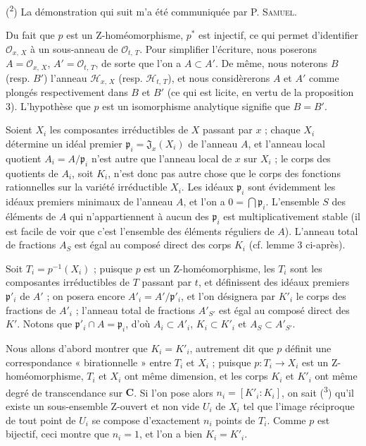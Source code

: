 (\textsuperscript{2}) La démonstration qui suit m'a été communiquée par P. \textsc{Samuel}.



Du fait que $p$ est un Z-homéomorphisme, $p^*$ est injectif, ce qui permet d'identifier $\mathcal{O}_{x,\, X}$ à un sous-anneau de $\mathcal{O}_{t,\, T}$. Pour simplifier l'écriture, nous poserons $A = \mathcal{O}_{x,\, X}$, $A' = \mathcal{O}_{t,\, T}$, de sorte que l'on a $A \subset A'$. De même, nous noterons $B$ (resp. $B'$) l'anneau $\mathcal{H}_{x,\, X}$ (resp. $\mathcal{H}_{t,\, T}$), et nous considèrerons $A$ et $A'$ comme plongés respectivement dans $B$ et $B'$ (ce qui est licite, en vertu de la proposition 3). L'hypothèse que $p$ est un isomorphisme analytique signifie que $B = B'$.

Soient $X_i$ les composantes irréductibles de $X$ passant par $x$ ; chaque $X_i$ détermine un idéal premier $\mathfrak{p}_i = \mathfrak{J}_x(X_i)$ de l'anneau $A$, et l'anneau local quotient $A_i = A/\mathfrak{p}_i$ n'est autre que l'anneau local de $x$ sur $X_i$ ; le corps des quotients de $A_i$, soit $K_i$, n'est donc pas autre chose que le corps des fonctions rationnelles sur la variété irréductible $X_i$. Les idéaux $\mathfrak{p}_i$ sont évidemment les idéaux premiers minimaux de l'anneau $A$, et l'on a $0 = \bigcap \mathfrak{p}_i$. L'ensemble $S$ des éléments de $A$ qui n'appartiennent à aucun des $\mathfrak{p}_i$ est multiplicativement stable (il est facile de voir que c'est l'ensemble des éléments réguliers de $A$). L'anneau total de fractions $A_S$ est égal au composé direct des corps $K_i$ (cf. lemme 3 ci-après).

Soit $T_i = p^{-1}(X_i)$ ; puisque $p$ est un Z-homéomorphisme, les $T_i$ sont les composantes irréductibles de $T$ passant par $t$, et définissent des idéaux premiers $\mathfrak{p}'_i$ de $A'$ ; on posera encore $A'_i = A'/\mathfrak{p}'_i$, et l'on désignera par $K'_i$ le corps des fractions de $A'_i$ ; l'anneau total de fractions $A'_{S'}$ est égal au composé direct des $K'$. Notons que $\mathfrak{p}'_i \cap A = \mathfrak{p}_i$, d'où $A_i \subset A'_i$, $K_i \subset K'_i$ et $A_S \subset A'_{S'}$.

Nous allons d'abord montrer que $K_i = K'_i$, autrement dit que $p$ définit une correspondance « birationnelle » entre $T_i$ et $X_i$ ; puisque $p : T_i \to X_i$ est un Z-homéomorphisme, $T_i$ et $X_i$ ont même dimension, et les corps $K_i$ et $K'_i$ ont même degré de transcendance sur $\mathbf{C}$. Si l'on pose alors $n_i = [K'_i : K_i]$, on sait (\textsuperscript{3}) qu'il existe un sous-ensemble Z-ouvert et non vide $U_i$ de $X_i$ tel que l'image réciproque de tout point de $U_i$ se compose d'exactement $n_i$ points de $T_i$. Comme $p$ est bijectif, ceci montre que $n_i = 1$, et l'on a bien $K_i = K'_i$.

